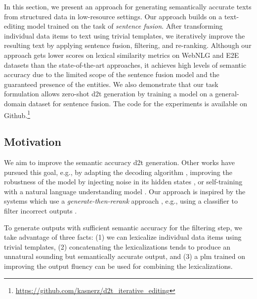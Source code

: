 In this section, we present an approach for generating semantically accurate texts from structured data in low-resource settings. Our approach builds on a text-editing model trained on the task of \emph{sentence fusion}. After transforming individual data items to text using trivial templates, we iteratively improve the resulting text by applying sentence fusion, filtering, and re-ranking.  Although our approach gets lower scores on lexical similarity metrics on WebNLG and E2E datasets than the state-of-the-art approaches, it achieves high levels of semantic accuracy due to the limited scope of the sentence fusion model and the guaranteed presence of the entities. We also demonstrate that our task formulation allows zero-shot \ac{d2t} generation by training a model on a general-domain dataset for sentence fusion. The code for the experiments is available on Github.\footnote{\url{https://github.com/kasnerz/d2t_iterative_editing}}


\subsection{Motivation}
\label{sec:text-editing}
We aim to improve the semantic accuracy \ac{d2t} generation. Other works have pursued this goal, e.g., by adapting the decoding algorithm \cite{tianStickingFactsConfident2020}, improving the robustness of the model by injecting noise in its hidden states \cite{kedzie_good_2019}, or self-training with a natural language understanding model \cite{nieSimpleRecipeReducing2019}. Our approach is inspired by the systems which use a \emph{generate-then-rerank} approach \citep{dusekSequencetoSequenceGenerationSpoken2016,juraska_deep_2018}, e.g., using a classifier to filter incorrect outputs \cite{harkousHaveYourText2020}.

To generate outputs with sufficient semantic accuracy for the filtering step, we take advantage of three facts: (1) we can lexicalize individual data items using trivial templates, (2) concatenating the lexicalizations tends to produce an unnatural sounding but semantically accurate output, and (3) a \ac{plm} trained on improving the output fluency can be used for combining the lexicalizations.


